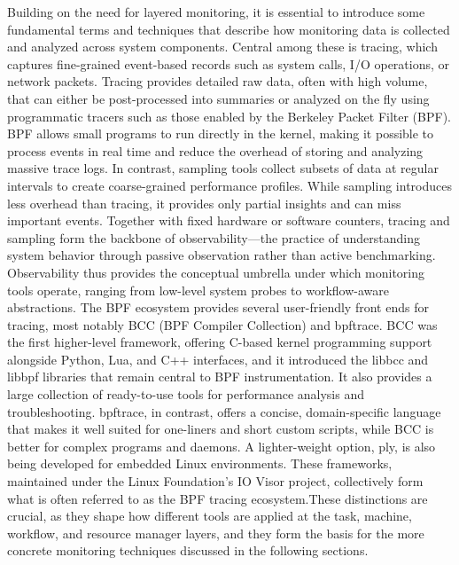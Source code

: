 Building on the need for layered monitoring, it is essential to introduce some fundamental terms and techniques that describe how monitoring data is collected and analyzed across system components. Central among these is tracing, which captures fine-grained event-based records such as system calls, I/O operations, or network packets. Tracing provides detailed raw data, often with high volume, that can either be post-processed into summaries or analyzed on the fly using programmatic tracers such as those enabled by the Berkeley Packet Filter (BPF). BPF allows small programs to run directly in the kernel, making it possible to process events in real time and reduce the overhead of storing and analyzing massive trace logs. In contrast, sampling tools collect subsets of data at regular intervals to create coarse-grained performance profiles. While sampling introduces less overhead than tracing, it provides only partial insights and can miss important events. Together with fixed hardware or software counters, tracing and sampling form the backbone of observability—the practice of understanding system behavior through passive observation rather than active benchmarking. Observability thus provides the conceptual umbrella under which monitoring tools operate, ranging from low-level system probes to workflow-aware abstractions. 
The BPF ecosystem provides several user-friendly front ends for tracing, most notably BCC (BPF Compiler Collection) and bpftrace. BCC was the first higher-level framework, offering C-based kernel programming support alongside Python, Lua, and C++ interfaces, and it introduced the libbcc and libbpf libraries that remain central to BPF instrumentation. It also provides a large collection of ready-to-use tools for performance analysis and troubleshooting. bpftrace, in contrast, offers a concise, domain-specific language that makes it well suited for one-liners and short custom scripts, while BCC is better for complex programs and daemons. A lighter-weight option, ply, is also being developed for embedded Linux environments. These frameworks, maintained under the Linux Foundation’s IO Visor project, collectively form what is often referred to as the BPF tracing ecosystem.These distinctions are crucial, as they shape how different tools are applied at the task, machine, workflow, and resource manager layers, and they form the basis for the more concrete monitoring techniques discussed in the following sections.


